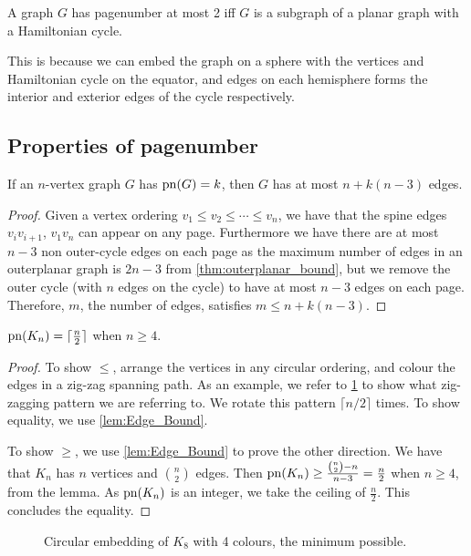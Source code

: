 \begin{lemma}\label{lem:Pagenumber_2}
	A graph \(G\) has pagenumber at most 2 iff \(G\) is a subgraph of a planar graph with a Hamiltonian cycle.
\end{lemma}
This is because we can embed the graph on a sphere with the vertices and Hamiltonian cycle on the equator, and edges on each hemisphere forms the interior and exterior edges of the cycle respectively.
\subsection{Properties of pagenumber}\label{ssec:Related_Properties}
\begin{lemma}\label{lem:Edge_Bound}
	If an \(n\)-vertex graph \(G\) has \(\operatorname{pn}(G) = k\), then \(G\) has at most \(n + k(n-3)\) edges.
\end{lemma}
\begin{proof}
	Given a vertex ordering \(v_1 \leq v_2 \leq \cdots \leq v_n\), we have that the spine edges \(v_i v_{i + 1}\), \(v_1 v_n\)  can appear on any page. Furthermore we have there are at most \(n-3\) non outer-cycle edges on each page as the maximum number of edges in an outerplanar graph is \(2n - 3\) from \cref{thm:outerplanar_bound}, but we remove the outer cycle (with \(n\) edges on the cycle) to have at most \(n-3\) edges on each page. Therefore, \(m\), the number of edges, satisfies \(m \leq n + k (n - 3)\).
\end{proof}
\begin{theorem}\label{thm:Pagenumber_Complete_Graph}
	$\operatorname{pn}(K_n) = \lceil \frac{n}{2} \rceil$ when $n \geq 4$.
\end{theorem}
\begin{proof}
	To show $\leq$, arrange the vertices in any circular ordering, and colour the edges in a zig-zag spanning path. As an example, we refer to \cref{fig:k8 coloured with colours} to show what zig-zagging pattern we are referring to. We rotate this pattern $\lceil n/2 \rceil$ times. To show equality, we use \cref{lem:Edge_Bound}.
	\par
	To show $\geq$, we use \cref{lem:Edge_Bound} to prove the other direction. We have that \(K_n\) has \(n\) vertices and \(\binom{n}{2}\) edges. Then \(\operatorname{pn}(K_n) \geq \frac{\binom{n}{2} - n}{n - 3} = \frac{n}{2}\) when \(n \geq 4\), from the lemma. As \(\operatorname{pn}(K_n)\) is an integer, we take the ceiling of \(\frac{n}{2}\). This concludes the equality.
\end{proof}
\begin{figure}[ht]
	\caption{Circular embedding of \(K_8\) with 4 colours, the minimum possible.}
	\centering
	
	\label{fig:k8 coloured with colours}
\end{figure}

